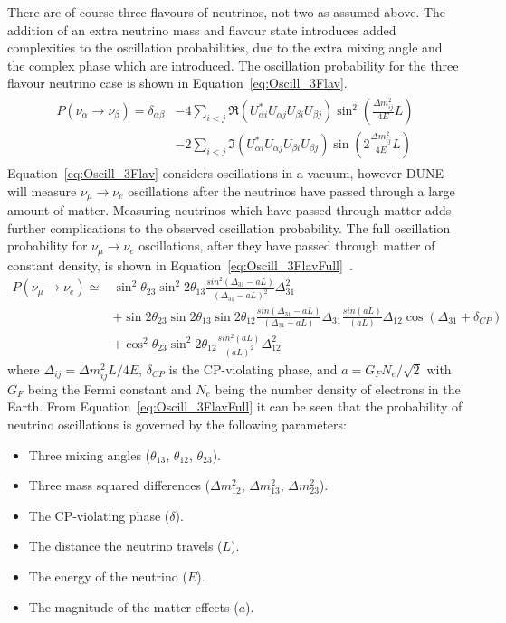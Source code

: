 There are of course three flavours of neutrinos, not two as assumed above. The addition of an extra neutrino mass and flavour state introduces added complexities to the oscillation probabilities, due to the extra mixing angle and the complex phase which are introduced. The oscillation probability for the three flavour neutrino case is shown in Equation~\ref{eq:Oscill_3Flav}.
\begin{align}
  \begin{split}
    \label{eq:Oscill_3Flav}
    P(\nu_{\alpha}\rightarrow\nu_{\beta}) = \delta_{\alpha\beta}
    & - 4 \sum_{i<j}\Re(U^{\ast}_{\alpha i}U_{\alpha j}U_{\beta i}U_{\beta j}) \sin^2\left(\frac{\Delta m^{2}_{ij}}{4E}L\right) \\
    & - 2 \sum_{i<j}\Im(U^{\ast}_{\alpha i}U_{\alpha j}U_{\beta i}U_{\beta j}) \sin\left(2\frac{\Delta m^{2}_{ij}}{4E}L\right)
  \end{split}
\end{align}
Equation~\ref{eq:Oscill_3Flav} considers oscillations in a vacuum, however DUNE will measure $\nu_{\mu}\rightarrow\nu_{e}$ oscillations after the neutrinos have passed through a large amount of matter. Measuring neutrinos which have passed through matter adds further complications to the observed oscillation probability. The full oscillation probability for $\nu_{\mu}\rightarrow\nu_{e}$ oscillations, after they have passed through matter of constant density, is shown in Equation~\ref{eq:Oscill_3FlavFull}~\citep{Nunokawa:2007qh}.
\begin{align}
  P(\nu_{\mu}\rightarrow\nu_{e}) \simeq
  & \sin^{2}\theta_{23} \sin^{2}2\theta_{13} \frac{sin^{2}(\Delta_{31}-aL)}{(\Delta_{31}-aL)^2}\Delta^{2}_{31} \label{eq:Oscill_3FlavFull} \\
  &+ \sin2\theta_{23} \sin2\theta_{13} \sin2\theta_{12} \frac{sin(\Delta_{31}-aL)}{(\Delta_{31}-aL)}\Delta_{31} \frac{sin(aL)}{(aL)} \Delta_{12} \cos(\Delta_{31}+\delta_{CP}) \nonumber \\
  &+ \cos^{2}\theta_{23} \sin^{2}2\theta_{12} \frac{sin^{2}(aL)}{(aL)^2}\Delta^{2}_{12} \nonumber
\end{align}
where $\Delta_{ij} = \Delta m^{2}_{ij}L/4E$, $\delta_{CP}$ is the CP-violating phase, and $a = G_{F}N_{e}/\sqrt{2}$ with $G_{F}$ being the Fermi constant and $N_{e}$ being the number density of electrons in the Earth. From Equation~\ref{eq:Oscill_3FlavFull} it can be seen that the probability of neutrino oscillations is governed by the following parameters:
\begin{itemize}
 \item Three mixing angles ($\theta_{13}$, $\theta_{12}$, $\theta_{23}$).
 \item Three mass squared differences ($\Delta m^{2}_{12}$, $\Delta m^{2}_{13}$, $\Delta m^{2}_{23}$).
 \item The CP-violating phase ($\delta$).
 \item The distance the neutrino travels ($L$).
 \item The energy of the neutrino ($E$).
 \item The magnitude of the matter effects ($a$).
\end{itemize}
